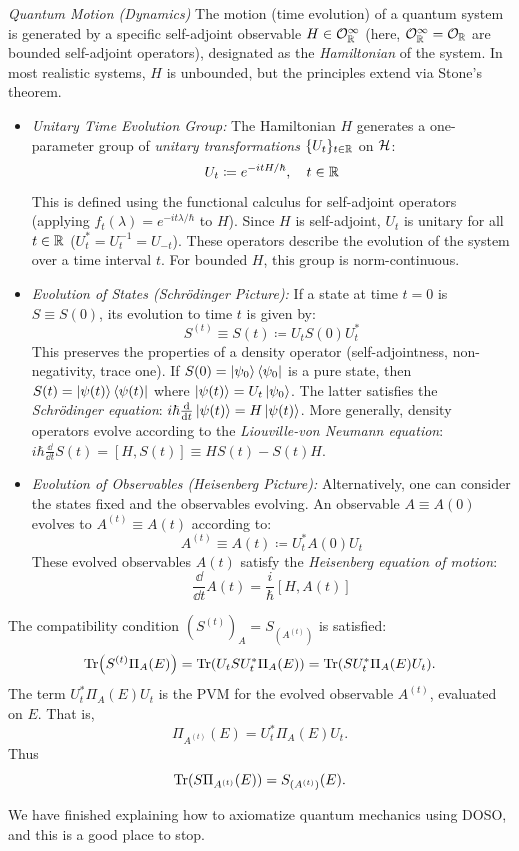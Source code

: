 \textit{Quantum Motion (Dynamics)}
The motion (time evolution) of a quantum system is generated by a specific self-adjoint observable $H \in \mathcal{O}_{\mathbb{R}}^\infty$ (here, $\mathcal{O}_{\mathbb{R}}^\infty = \mathcal{O}_{\mathbb{R}}$ are bounded self-adjoint operators), designated as the \textit{Hamiltonian} of the system. In most realistic systems, $H$ is unbounded, but the principles extend via Stone's theorem.

\begin{itemize}
\item \textit{Unitary Time Evolution Group:}
The Hamiltonian $H$ generates a one-parameter group of \textit{unitary transformations} $\{U_t\}_{t\in\mathbb{R}}$ on $\mathcal{H}$:
\[ U_t \coloneqq e^{-itH/\hbar}, \quad t \in \mathbb{R} \]
This is defined using the functional calculus for self-adjoint operators (applying $f_t(\lambda) = e^{-it\lambda/\hbar}$ to $H$). Since $H$ is self-adjoint, $U_t$ is unitary for all $t \in \mathbb{R}$ ($U_t^* = U_t^{-1} = U_{-t}$). These operators describe the evolution of the system over a time interval $t$. For bounded $H$, this group is norm-continuous.

\item \textit{Evolution of States (Schrödinger Picture):}
If a state at time $t=0$ is $S \equiv S(0)$, its evolution to time $t$ is given by:
\[ S^{(t)} \equiv S(t) \coloneqq U_t S(0) U_t^* \]
This preserves the properties of a density operator (self-adjointness, non-negativity, trace one). If $S(0) = \ket{\psi_0}\bra{\psi_0}$ is a pure state, then $S(t) = \ket{\psi(t)}\bra{\psi(t)}$ where $\ket{\psi(t)} = U_t\ket{\psi_0}$. The latter satisfies the \textit{Schrödinger equation}: $i\hbar \frac{\dd}{\dd t}\ket{\psi(t)} = H\ket{\psi(t)}$. More generally, density operators evolve according to the \textit{Liouville-von Neumann equation}: $i\hbar \frac{\dd}{\dd t}S(t) = [H, S(t)] \equiv HS(t) - S(t)H$.

\item \textit{Evolution of Observables (Heisenberg Picture):}
Alternatively, one can consider the states fixed and the observables evolving. An observable $A \equiv A(0)$ evolves to $A^{(t)} \equiv A(t)$ according to:
\[ A^{(t)} \equiv A(t) \coloneqq U_t^* A(0) U_t \]
These evolved observables $A(t)$ satisfy the \textit{Heisenberg equation of motion}:
\[ \frac{\dd}{\dd t}A(t) = \frac{i}{\hbar}[H, A(t)] \]
\end{itemize}
The compatibility condition $(S^{(t)})_A = S_{(A^{(t)})}$ is satisfied:
\[\Tr(S^{(t)}\Pi_A(E)) = \Tr(U_t S U_t^* \Pi_A(E)) = \Tr(S U_t^* \Pi_A(E) U_t).\] 
The term $U_t^* \Pi_A(E) U_t$ is the PVM for the evolved observable $A^{(t)}$, evaluated on $E$. That is, 
\[\Pi_{A^{(t)}}(E) = U_t^* \Pi_A(E) U_t.\] Thus 
\[\Tr(S \Pi_{A^{(t)}}(E)) = S_{(A^{(t)})}(E).\]

We have finished explaining how to axiomatize quantum mechanics using DOSO, and this is a good place to stop.